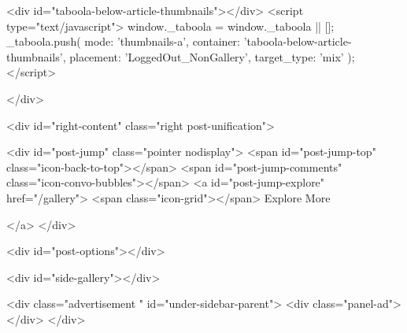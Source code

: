                             <div id="taboola-below-article-thumbnails"></div>
                                    <script type="text/javascript">
                        window._taboola = window._taboola || [];
                        _taboola.push({
                            mode: 'thumbnails-a',
                            container: 'taboola-below-article-thumbnails',
                            placement: 'LoggedOut_NonGallery',
                            target_type: 'mix'
                        });
                    </script>
                
            

            
        </div>

        <div id="right-content" class="right post-unification">

            <div id="post-jump" class="pointer nodisplay">
                <span id="post-jump-top" class="icon-back-to-top"></span>
                <span id="post-jump-comments" class="icon-convo-bubbles"></span>
                <a id="post-jump-explore" href="/gallery">
                    <span class="icon-grid"></span>
                    Explore
                                            More
                    
                </a>
            </div>

            <div id="post-options"></div>

            <div id="side-gallery"></div>

                            

                
            

                                                <div class="advertisement " id="under-sidebar-parent">
                        <div class="panel-ad">
                        </div>
                    </div>
                
            

            

